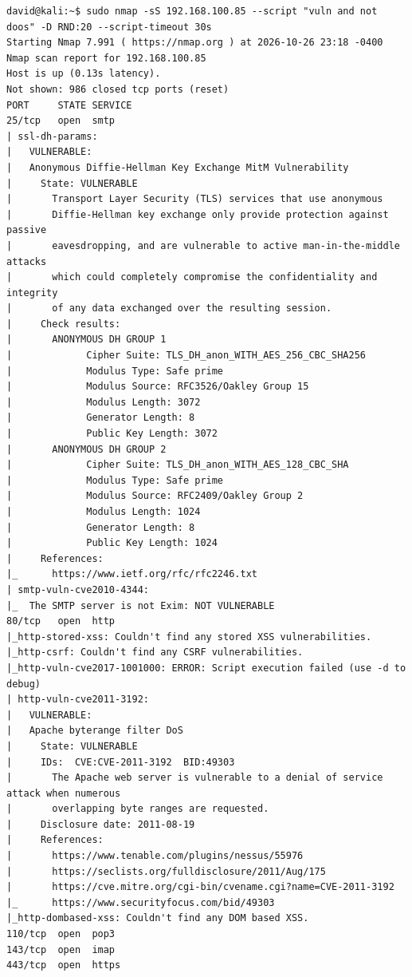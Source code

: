 \begin{lstlisting}[style=terminal, caption={Reporte Íntegro del Escaneo de Vulnerabilidades con Nmap NSE sobre 192.168.100.85}, label={lst:evidencia-nmap-real}]
david@kali:~$ sudo nmap -sS 192.168.100.85 --script "vuln and not doos" -D RND:20 --script-timeout 30s
Starting Nmap 7.991 ( https://nmap.org ) at 2026-10-26 23:18 -0400
Nmap scan report for 192.168.100.85
Host is up (0.13s latency).
Not shown: 986 closed tcp ports (reset)
PORT     STATE SERVICE
25/tcp   open  smtp
| ssl-dh-params: 
|   VULNERABLE:
|   Anonymous Diffie-Hellman Key Exchange MitM Vulnerability
|     State: VULNERABLE
|       Transport Layer Security (TLS) services that use anonymous
|       Diffie-Hellman key exchange only provide protection against passive
|       eavesdropping, and are vulnerable to active man-in-the-middle attacks
|       which could completely compromise the confidentiality and integrity
|       of any data exchanged over the resulting session.
|     Check results:
|       ANONYMOUS DH GROUP 1
|             Cipher Suite: TLS_DH_anon_WITH_AES_256_CBC_SHA256
|             Modulus Type: Safe prime
|             Modulus Source: RFC3526/Oakley Group 15
|             Modulus Length: 3072
|             Generator Length: 8
|             Public Key Length: 3072
|       ANONYMOUS DH GROUP 2
|             Cipher Suite: TLS_DH_anon_WITH_AES_128_CBC_SHA
|             Modulus Type: Safe prime
|             Modulus Source: RFC2409/Oakley Group 2
|             Modulus Length: 1024
|             Generator Length: 8
|             Public Key Length: 1024
|     References:
|_      https://www.ietf.org/rfc/rfc2246.txt
| smtp-vuln-cve2010-4344: 
|_  The SMTP server is not Exim: NOT VULNERABLE
80/tcp   open  http
|_http-stored-xss: Couldn't find any stored XSS vulnerabilities.
|_http-csrf: Couldn't find any CSRF vulnerabilities.
|_http-vuln-cve2017-1001000: ERROR: Script execution failed (use -d to debug)
| http-vuln-cve2011-3192: 
|   VULNERABLE:
|   Apache byterange filter DoS
|     State: VULNERABLE
|     IDs:  CVE:CVE-2011-3192  BID:49303
|       The Apache web server is vulnerable to a denial of service attack when numerous
|       overlapping byte ranges are requested.
|     Disclosure date: 2011-08-19
|     References:
|       https://www.tenable.com/plugins/nessus/55976
|       https://seclists.org/fulldisclosure/2011/Aug/175
|       https://cve.mitre.org/cgi-bin/cvename.cgi?name=CVE-2011-3192
|_      https://www.securityfocus.com/bid/49303
|_http-dombased-xss: Couldn't find any DOM based XSS.
110/tcp  open  pop3
143/tcp  open  imap
443/tcp  open  https

\end{lstlisting}
